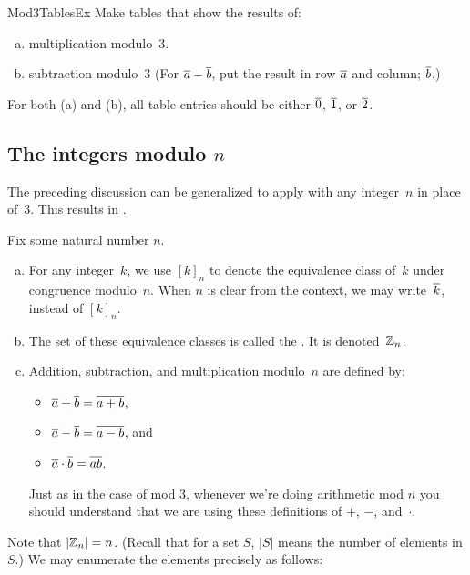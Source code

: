 \begin{exercise}{Mod3TablesEx}
Make tables that show the results of:
\begin{enumerate}[(a)]
\item \label{Mod3TablesEx-multiplication}
multiplication modulo~$3$.
\item \label{Mod3TablesEx-subtraction}
subtraction modulo~$3$ (For $\overline{a} - \overline{b}$,  put the result in row $\overline{a}$ and column; $\overline{b}$.)
\end{enumerate}
For both (a) and (b), all table entries should be  either $\overline{0}$, $\overline{1}$, or $\overline{2}$.
\end{exercise}



\subsection{The integers modulo $n$}
The preceding discussion can be generalized to apply with any integer~$n$ in place of~$3$. This results in .

\begin{defn} \label{integ_mod_n}
Fix some natural number $n$.
\begin{enumerate}[(a)]
\item For any integer~$k$, we use $[k]_n$ to denote the equivalence class of~$k$ under congruence modulo~$n$. When $n$ is clear from the context, we may write~$\overline{k}$, instead of $[k]_n$.
\item The set of these equivalence classes is called the . It is denoted~$\mathbb{Z}_n$.

 \item Addition, subtraction, and multiplication modulo~$n$ are defined by:
\begin{itemize}
\item $\overline{a} \mathbin{+} \overline{b} = \overline{a + b}$,
\item $\overline{a} \mathbin{-} \overline{b} = \overline{a - b}$,
and
\item $\overline{a} \cdot \overline{b} = \overline{a  b}$.
\end{itemize}
Just as in the case of mod 3, whenever we're doing arithmetic mod $n$ you should understand that we are using these definitions of  $+$, $-$, and~$\cdot$.
\end{enumerate}
\end{defn}


Note that $\left|\mathbb{Z}_n \right| = n$. (Recall that for a set $S$, $|S|$ means the number of elements in $S$.) We may enumerate the elements precisely as follows:

